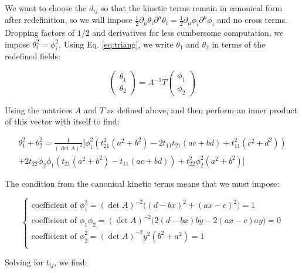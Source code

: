 \documentclass[11pt]{article}
\begin{document}
We want to choose the $d_{ij}$ so that the kinetic terms remain in canonical form after redefinition, so we will impose  $\frac{1}{2}\partial_\mu\theta_i \partial^\mu\theta_i = \frac{1}{2}\partial_\mu\phi_i \partial^\mu\phi_i $ and no cross terms. Dropping factors of $1/2$ and derivatives for less cumbersome computation, we impose $\theta_i^2 = \phi^2_i$. Using Eq. \eqref{eq:triang}, we write $\theta_1$ and $\theta_2$ in terms of the redefined fields:

\begin{equation}
    \begin{pmatrix}
        \theta_1 \\
        \theta_2
    \end{pmatrix}
    = 
   A^{-1} T 
    \begin{pmatrix}
        \phi_1 \\
        \phi_2
    \end{pmatrix}
\end{equation}

\noindent Using the matrices $A$ and $T$ as defined above, and then perform an inner product of this vector with itself to find:

\begin{align*}
     \label{eq:dotprod}
    \theta_1^2+\theta_2^2 = \frac{1}{(\det{A})^2} \big[ 
    \phi_1^2 \left(t_{21}^2 \left(a^2+b^2\right)-2 t_{11}t_{21} (a c+b d)+t_{11}^2 \left(c^2+d^2\right)\right) \\
    + 2 t_{22} \phi _2 \phi _1 \left(t_{21}\left(a^2+b^2\right)-t_{11} (a c+b d)\right)+t_{22}^2 \phi _2^2 \left(a^2+b^2\right)
    \big]
\end{align*}

The condition from the canonical kinetic terms means that we must impose:

\begin{equation}
    \label{eq:constraints}
    \begin{cases}
        \text{coefficient of }\phi_1^2 = (\det{A})^{-2}\big((d-bx)^2+(ax-c)^2\big)= 1 \\
        \text{coefficient of }\phi_1\phi_2 = (\det{A})^{-2}\big(2(d-bx)by-2(ax-c)ay\big)= 0 \\
        \text{coefficient of }\phi_2^2 = (\det{A})^{-2}y^2(b^2+a^2) =1 \\
    \end{cases}
\end{equation}

Solving for $t_{ij}$, we find:
\end{document}
